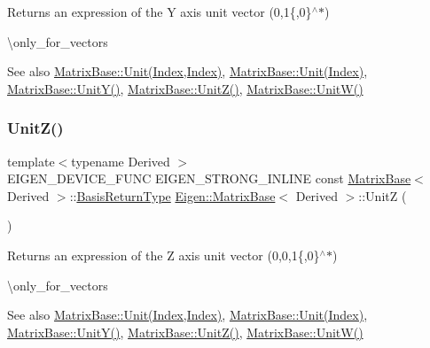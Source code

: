\begin{DoxyReturn}{Returns}
an expression of the Y axis unit vector (0,1\{,0\}$^\wedge$$\ast$)
\end{DoxyReturn}
\textbackslash{}only\+\_\+for\+\_\+vectors

\begin{DoxySeeAlso}{See also}
\mbox{\hyperlink{class_eigen_1_1_matrix_base_a1f39dde25807c1f008aa874e690b3fed}{Matrix\+Base\+::\+Unit(\+Index,\+Index)}}, \mbox{\hyperlink{class_eigen_1_1_matrix_base_a9d7e97faf7755d3e85e831153f02846c}{Matrix\+Base\+::\+Unit(\+Index)}}, \mbox{\hyperlink{class_eigen_1_1_matrix_base_ab8e21066a2e5cf5ca8bb0383e44a6efa}{Matrix\+Base\+::\+Unit\+Y()}}, \mbox{\hyperlink{class_eigen_1_1_matrix_base_a122e525a8f5ef3e4d459055615f662de}{Matrix\+Base\+::\+Unit\+Z()}}, \mbox{\hyperlink{class_eigen_1_1_matrix_base_ac28c3d440440464b1fc8d9f2a6d5624a}{Matrix\+Base\+::\+Unit\+W()}} 
\end{DoxySeeAlso}
\mbox{\label{class_eigen_1_1_matrix_base_a122e525a8f5ef3e4d459055615f662de}} 
\subsubsection{\texorpdfstring{UnitZ()}{UnitZ()}}
{\footnotesize\ttfamily template$<$typename Derived $>$ \\
E\+I\+G\+E\+N\+\_\+\+D\+E\+V\+I\+C\+E\+\_\+\+F\+U\+NC E\+I\+G\+E\+N\+\_\+\+S\+T\+R\+O\+N\+G\+\_\+\+I\+N\+L\+I\+NE const \mbox{\hyperlink{class_eigen_1_1_matrix_base}{Matrix\+Base}}$<$ Derived $>$\+::\mbox{\hyperlink{class_eigen_1_1_block}{Basis\+Return\+Type}} \mbox{\hyperlink{class_eigen_1_1_matrix_base}{Eigen\+::\+Matrix\+Base}}$<$ Derived $>$\+::UnitZ (\begin{DoxyParamCaption}{ }\end{DoxyParamCaption})\hspace{0.3cm}{\ttfamily [static]}}

\begin{DoxyReturn}{Returns}
an expression of the Z axis unit vector (0,0,1\{,0\}$^\wedge$$\ast$)
\end{DoxyReturn}
\textbackslash{}only\+\_\+for\+\_\+vectors

\begin{DoxySeeAlso}{See also}
\mbox{\hyperlink{class_eigen_1_1_matrix_base_a1f39dde25807c1f008aa874e690b3fed}{Matrix\+Base\+::\+Unit(\+Index,\+Index)}}, \mbox{\hyperlink{class_eigen_1_1_matrix_base_a9d7e97faf7755d3e85e831153f02846c}{Matrix\+Base\+::\+Unit(\+Index)}}, \mbox{\hyperlink{class_eigen_1_1_matrix_base_ab8e21066a2e5cf5ca8bb0383e44a6efa}{Matrix\+Base\+::\+Unit\+Y()}}, \mbox{\hyperlink{class_eigen_1_1_matrix_base_a122e525a8f5ef3e4d459055615f662de}{Matrix\+Base\+::\+Unit\+Z()}}, \mbox{\hyperlink{class_eigen_1_1_matrix_base_ac28c3d440440464b1fc8d9f2a6d5624a}{Matrix\+Base\+::\+Unit\+W()}} 
\end{DoxySeeAlso}



